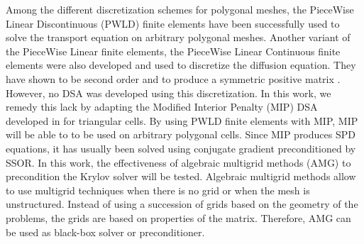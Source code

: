 Among the different discretization schemes for polygonal meshes, the PieceWise 
Linear Discontinuous (PWLD) finite elements \cite{pwld_3d,pwld_2d} 
have been successfully used to solve the transport equation on arbitrary
polygonal meshes. Another variant of the PieceWise Linear finite elements, the
PieceWise Linear Continuous finite elements were also developed and used 
to discretize the diffusion equation. They have shown to be second order and to
produce a symmetric positive matrix \cite{pwl_diffusion}. However, no 
DSA \cite{dsa_ref,larsen_dsa,consistent_p1} 
was developed using this discretization. In this work, we remedy this lack by 
adapting the Modified Interior Penalty (MIP) DSA developed in \cite{mip} for 
triangular cells. By using PWLD finite elements with MIP, MIP will be able to 
to be used on arbitrary polygonal cells. Since MIP produces SPD equations, it 
has usually been solved using conjugate gradient preconditioned by SSOR. In 
this work, the effectiveness of algebraic multigrid methods (AMG) to precondition 
the Krylov solver \cite{amg,amg_course} will be tested. Algebraic multigrid methods 
allow to use multigrid techniques when there is no grid or when the mesh is 
unstructured. Instead of using a succession of grids based on the geometry of the 
problems, the grids are based on properties of the matrix. Therefore, AMG can
be used as black-box solver or preconditioner.
